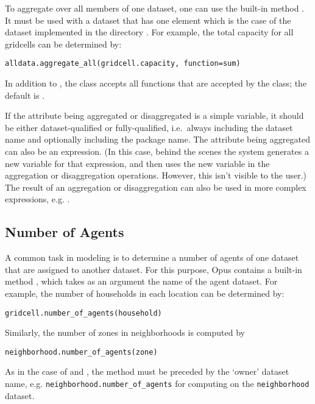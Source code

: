 To aggregate over all members of one dataset, \datasetindex one can use the
built-in method . It must be used with a dataset
\datasetindex that has one element which is the case of the
 dataset \datasetindex {}
implemented in the directory . For example, the total
capacity for all gridcells can be determined by:
\begin{verbatim}
alldata.aggregate_all(gridcell.capacity, function=sum)
\end{verbatim}
In addition to , the  class accepts all
functions that are accepted by the  class;
the default is .

If the attribute being aggregated or disaggregated is a simple variable, it
should be either dataset-qualified or fully-qualified, i.e.\ always
including the dataset name and optionally including the package name.  The
attribute being aggregated can also be an expression.  (In this case,
behind the scenes the system generates a new variable for that expression,
and then uses the new variable in the aggregation or disaggregation
operations.  However, this isn't visible to the user.)  The result of an
aggregation or disaggregation can also be used in more complex expressions,
e.g. .

\subsection{Number of Agents}

A common task in modeling is to determine a number of agents of one dataset
\datasetindex that are assigned to another dataset. \datasetindex For this
purpose, Opus contains a built-in method , which
takes as an argument the name of the agent dataset.  For example,
the number of households in each location can be determined by:
\variablesindex \attributesindex
\begin{verbatim}
gridcell.number_of_agents(household)
\end{verbatim}

Similarly, the number of zones in neighborhoods is computed by
\begin{verbatim}
neighborhood.number_of_agents(zone)
\end{verbatim}

As in the case of  and , the
 method must be preceded by the `owner' dataset
name, e.g. \verb|neighborhood.number_of_agents| for computing on the
\verb|neighborhood| dataset.

